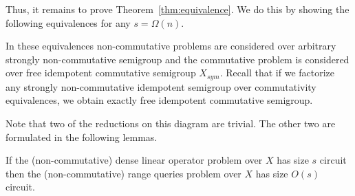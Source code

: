 \documentclass[review,onefignum,onetabnum]{siamart190516}
\begin{document}
Thus, it remains to prove Theorem~\ref{thm:equivalence}. We do this by showing
the following equivalences for any $s = \Omega(n)$.

\vspace{2mm}
\begin{center}
\end{center}
\vspace{2mm}

In these equivalences non-commutative problems are considered over arbitrary
strongly non-commutative semigroup and the commutative problem is considered
over free idempotent commutative semigroup $X_{sym}$. Recall that
if we factorize any strongly non-commutative idempotent semigroup over
commutativity equivalences, we obtain exactly free idempotent commutative
semigroup.

Note that two of the reductions on this diagram are trivial. The other two are
formulated in the following lemmas.

%
%

\begin{lemma} \label{lem:dense_matrices}
If the (non-commutative) dense linear operator problem over $X$ has size $s$
circuit then the (non-commutative) range queries problem over $X$ has size
$O(s)$ circuit.
\end{lemma}
\end{document}
